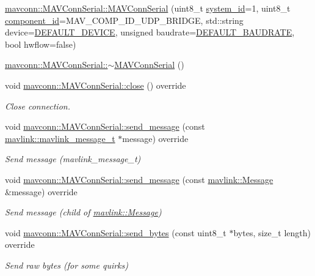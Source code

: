 \begin{DoxyCompactItemize}
\mbox{\hyperlink{group__mavconn_ga53b8b8d9fceab4d4a2767b3aa0a25462}{mavconn\+::\+M\+A\+V\+Conn\+Serial\+::\+M\+A\+V\+Conn\+Serial}} (uint8\+\_\+t \mbox{\hyperlink{setHome_8cpp_a83150acb88d810ae6864b4c125324ed6}{system\+\_\+id}}=1, uint8\+\_\+t \mbox{\hyperlink{setHome_8cpp_adc84285d5da2c4fa9721d0a32d5e41a7}{component\+\_\+id}}=M\+A\+V\+\_\+\+C\+O\+M\+P\+\_\+\+I\+D\+\_\+\+U\+D\+P\+\_\+\+B\+R\+I\+D\+GE, std\+::string device=\mbox{\hyperlink{group__mavconn_ga3b2c35e0bfa1020060b2fde345d66f0e}{D\+E\+F\+A\+U\+L\+T\+\_\+\+D\+E\+V\+I\+CE}}, unsigned baudrate=\mbox{\hyperlink{group__mavconn_gaf0dd28c4a6b236f2ec3092a1b35ff5df}{D\+E\+F\+A\+U\+L\+T\+\_\+\+B\+A\+U\+D\+R\+A\+TE}}, bool hwflow=false)
\item 
\mbox{\hyperlink{group__mavconn_ga63860bdb6f3eb8a5ef266fc99edd715d}{mavconn\+::\+M\+A\+V\+Conn\+Serial\+::$\sim$\+M\+A\+V\+Conn\+Serial}} ()
\item 
void \mbox{\hyperlink{group__mavconn_gabacc69adc5d2d2f9cb3aa27907d83d5c}{mavconn\+::\+M\+A\+V\+Conn\+Serial\+::close}} () override
\begin{DoxyCompactList}\small\item\em Close connection. \end{DoxyCompactList}\item 
void \mbox{\hyperlink{group__mavconn_ga452a97c9cd256b591eee063a1927a93a}{mavconn\+::\+M\+A\+V\+Conn\+Serial\+::send\+\_\+message}} (const \mbox{\hyperlink{include__v0_89_2mavlink__types_8h_a63b963764c09dc72f4910c1521e325b9}{mavlink\+::mavlink\+\_\+message\+\_\+t}} $\ast$message) override
\begin{DoxyCompactList}\small\item\em Send message (mavlink\+\_\+message\+\_\+t) \end{DoxyCompactList}\item 
void \mbox{\hyperlink{group__mavconn_ga7e251c28c05beb0becbe571f5f39c3bb}{mavconn\+::\+M\+A\+V\+Conn\+Serial\+::send\+\_\+message}} (const \mbox{\hyperlink{structmavlink_1_1Message}{mavlink\+::\+Message}} \&message) override
\begin{DoxyCompactList}\small\item\em Send message (child of \mbox{\hyperlink{structmavlink_1_1Message}{mavlink\+::\+Message}}) \end{DoxyCompactList}\item 
void \mbox{\hyperlink{group__mavconn_ga6073d6f88157f3b29ee519eafe16f8fd}{mavconn\+::\+M\+A\+V\+Conn\+Serial\+::send\+\_\+bytes}} (const uint8\+\_\+t $\ast$bytes, size\+\_\+t length) override
\begin{DoxyCompactList}\small\item\em Send raw bytes (for some quirks) \end{DoxyCompactList}\item 

\end{DoxyCompactItemize}
